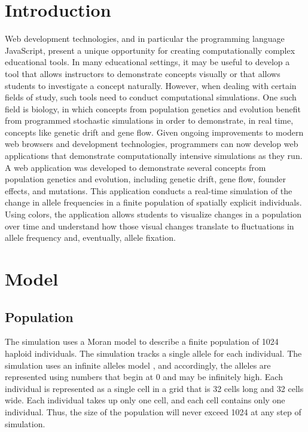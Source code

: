 \documentclass[12pt]{article}
\begin{document}
\begin{spacing}{1.6}
\section{Introduction}

Web development technologies, and in particular the programming language JavaScript, present a unique opportunity for creating computationally complex educational tools. In many educational settings, it may be useful to develop a tool that allows instructors to demonstrate concepts visually or that allows students to investigate a concept naturally. However, when dealing with certain fields of study, such tools need to conduct computational simulations. One such field is biology, in which concepts from population genetics and evolution benefit from programmed stochastic simulations in order to demonstrate, in real time, concepts like genetic drift and gene flow. Given ongoing improvements to modern web browsers and development technologies, programmers can now develop web applications that demonstrate computationally intensive simulations as they run. A web application was developed to demonstrate several concepts from population genetics and evolution, including genetic drift, gene flow, founder effects, and mutations. This application conducts a real-time simulation of the change in allele frequencies in a finite population of spatially explicit individuals. Using colors, the application allows students to visualize changes in a population over time and understand how those visual changes translate to fluctuations in allele frequency and, eventually, allele fixation.

\section{Model}

\subsection{Population}
The simulation uses a Moran model \cite{moran} to describe a finite population of 1024 haploid individuals. The simulation tracks a single allele for each individual. The simulation uses an infinite alleles model \cite{moran}, and accordingly, the alleles are represented using numbers that begin at 0 and may be infinitely high. Each individual is represented as a single cell in a grid that is 32 cells long and 32 cells wide. Each individual takes up only one cell, and each cell contains only one individual. Thus, the size of the population will never exceed 1024 at any step of simulation.


\end{spacing}
\end{document}
